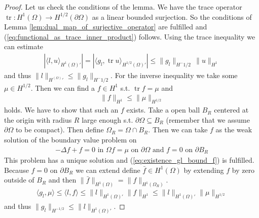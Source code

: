 \documentclass[12pt,a4paper]{article}
\numberwithin{equation}{subsection}
\numberwithin{lemma}{subsection}
\theoremstyle{definition}
\DeclareMathOperator{\tr}{tr}
\begin{document}
\begin{proof}
    Let us check the conditions of the lemma. We have the trace operator 
    $\tr: H^1(\Omega) \rightarrow H^{1/2}(\partial \Omega)$ as a 
    linear bounded surjection. So the conditions of 
    Lemma \ref{lem:dual_map_of_surjective_operator} are fulfilled 
    and (\ref{eq:functional_as_trace_inner_product}) follows.
    Using the trace inequality  we can estimate 
    \begin{align*}
        |\langle l, u \rangle_{H^1(\Omega)'}| = |\langle g_l, \tr u \rangle_{H^{1/2}(\Omega)'}|
        \leq \lVert g_l \rVert _{H^-1/2} \, \lVert u \rVert _{H^1} 
    \end{align*}
    and thus $\lVert l \rVert _{H^(\Omega)'} \leq \lVert g_l \rVert _{H^-1/2}$. For the inverse inequality
    we take some $\mu \in H^{1/2}$. Then we can find a $f \in H^1$ s.t. $\tr f = \mu$ and 
    \begin{align}
        \lVert f \rVert _{H^1} \leq \lVert \mu \rVert _{H^{1/2}}\label{eq:existence_gl_bound_f}
    \end{align}
    holds.
    We have to show that such an $f$ exists. Take a open ball $B_R$ centered at the 
    origin with radius $R$ large enough s.t. $\partial \Omega \subseteq B_R$ (remember 
    that we assume $\partial \Omega$ to be compact). Then define 
    $\Omega_R = \Omega \cap B_R$.
    Then we can take $f$ as the weak solution of the boundary value problem on 
    \begin{align*}
        -\Delta f + f = 0 \text{ in $\Omega$}
        f = \mu \text{ on $\partial \Omega$ and $f = 0$ on $\partial B_R$}
    \end{align*}
    This problem has a unique solution \cite[Thm.3.12]{monk} and 
    (\ref{eq:existence_gl_bound_f}) is fulfilled. Because 
    $f= 0$ on $\partial B_R$ we can extend define $\bar{f} \in H^1(\Omega)$ by 
    extending $f$ by zero outside of $B_R$ and then 
    $\lVert \bar{f} \rVert _{H^1(\Omega)} =  \lVert f \rVert _{H^1(\Omega_R)}$.
    \begin{align*}
        \langle g_l, \mu \rangle \leq \langle l, f \rangle 
        \leq \lVert l \rVert _{H^1(\Omega)'} \lVert  f \rVert _{H^1}
        \leq \lVert l \rVert _{H^1(\Omega)'} \lVert  \mu \rVert _{H^{1/2}}
    \end{align*}
    and thus $\lVert g_l \rVert _{H^{-1/2}} \leq \lVert l \rVert _{H^1(\Omega)'}$.
\end{proof}
\end{document}
